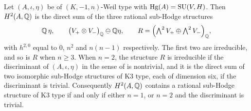 \begin{proposition}%
\label{prop:normpart}
Let $(A,\iota,\eta)$ be of $(K,-1,n)$-Weil type with $\operatorname{Hg}(A)=\operatorname{SU}(V,H)$. Then
$H^{2}(A,\mathbb{Q})$ is the direct sum of the three rational sub-Hodge structures
\[
  \mathbb{Q}\,\eta,
  \qquad
  \bigl(V_{+}\otimes V_{-}\bigr)_{\mathbb{Q}}\ominus\mathbb{Q}\eta,
  \qquad
  R=\Bigl(\textstyle\bigwedge^{2}V_{+}\oplus\bigwedge^{2}V_{-}\Bigr)_{\mathbb{Q}},
\]
with $h^{2,0}$ equal to $0$, $n^{2}$ and $n(n-1)$ respectively. The first two
are irreducible, and so is $R$ when $n\ge3$. When $n=2$, the structure $R$ is
irreducible if the discriminant of $(A,\iota,\eta)$ in the sense of
 is nontrivial, and it is the direct sum of two isomorphic
sub-Hodge structures of K3 type, each of dimension six, if the discriminant
is trivial. Consequently $H^{2}(A,\mathbb{Q})$ contains a rational sub-Hodge
structure of K3 type if and only if either $n=1$, or $n=2$ and the
discriminant is trivial.
\end{proposition}

